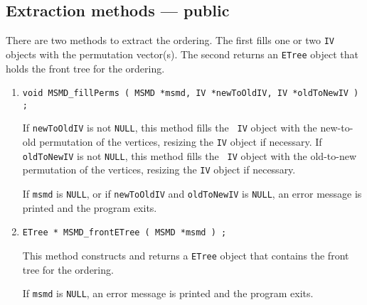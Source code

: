\subsection{Extraction methods --- public}
\label{subsection:MSMD:proto:extraction}
\par
There are two methods to extract the ordering.
The first fills one or two {\tt IV} objects with the permutation
vector(s).
The second returns an {\tt ETree} object that holds the front tree
for the ordering.
\par
\begin{enumerate}
\item
\begin{verbatim}
void MSMD_fillPerms ( MSMD *msmd, IV *newToOldIV, IV *oldToNewIV ) ;
\end{verbatim}
If {\tt newToOldIV} is not {\tt NULL}, this method fills the {\tt
IV} object with the new-to-old permutation of the vertices,
resizing the {\tt IV} object if necessary.
If {\tt oldToNewIV} is not {\tt NULL}, this method fills the {\tt
IV} object with the old-to-new permutation of the vertices,
resizing the {\tt IV} object if necessary.
\par {}
If {\tt msmd} is {\tt NULL},
or if {\tt newToOldIV} and {\tt oldToNewIV} is {\tt NULL},
an error message is printed and the program exits.
\item
\begin{verbatim}
ETree * MSMD_frontETree ( MSMD *msmd ) ;
\end{verbatim}
This method constructs and returns a {\tt ETree} object that
contains the front tree for the ordering.
\par {}
If {\tt msmd} is {\tt NULL},
an error message is printed and the program exits.
\end{enumerate}
\par
